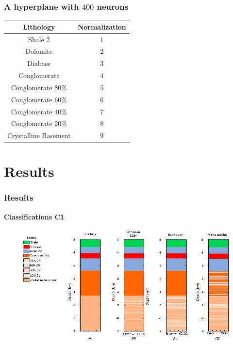 \documentclass[aspectratio=10]{beamer} %
\begin{document}
\begin{frame}
	\frametitle{A hyperplane with $400$ neurons}
	\begin{table}[H]
		\centering
		\begin{tabular}{c|c}
			
			Lithology                   & Normalization \\ %
			\hline                                                             %
			Shale 2                 &  1\\
			Dolomite  		            &  2 \\
			Diabase    	            &  3 \\
			Conglomerate          &  4 \\
			Conglomerate 80\% &  5  \\
			Conglomerate 60\%&  6 \\
			Conglomerate 40\%&  7\\
			Conglomerate 20\%&  8 \\
			Crystalline Basement          &  9 \\
			
		\end{tabular}
		\label{codigos}
	\end{table}
\end{frame}

\section{Results}

\begin{frame}
\frametitle{Results}
\framesubtitle{Classifications C1}
	\begin{figure}[H]
		\centering
		 \includegraphics[scale=0.35]{Imagens/IDC1020118.eps}
		\label{C1}
	\end{figure}
\end{frame}
\end{document}
